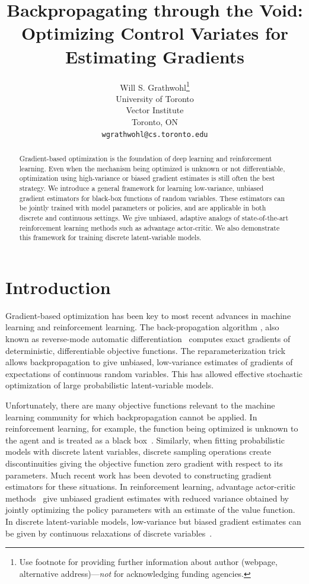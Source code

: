 \documentclass{article}
\title{Backpropagating through the Void:\\ Optimizing Control Variates for\\ Estimating Gradients}
\author{
  Will S. Grathwohl\thanks{Use footnote for providing further
    information about author (webpage, alternative
    address)---\emph{not} for acknowledging funding agencies.} \\
  University of Toronto\\
  Vector Institute\\
  Toronto, ON \\
  \texttt{wgrathwohl@cs.toronto.edu} \\
}
\begin{document}
\maketitle
\begin{abstract}
Gradient-based optimization is the foundation of deep learning and reinforcement learning.
Even when the mechanism being optimized is unknown or not differentiable, optimization using high-variance or biased gradient estimates is still often the best strategy.
We introduce a general framework for learning low-variance, unbiased gradient estimators for black-box functions of random variables.
These estimators can be jointly trained with model parameters or policies, and are applicable in both discrete and continuous settings.
We give unbiased, adaptive analogs of state-of-the-art reinforcement learning methods such as advantage actor-critic.
We also demonstrate this framework for training discrete latent-variable models.
\end{abstract}


\section{Introduction}
Gradient-based optimization has been key to most recent advances in machine learning and reinforcement learning.
The back-propagation algorithm \citep{rumelhart1986learning}, also known as reverse-mode automatic differentiation~\citep{speelpenning1980compiling, rall1981automatic} computes exact gradients of deterministic, differentiable objective functions.
The reparameterization trick \citep{williams1992simple, kingma2013autoencoding, rezende2014stochastic} allows backpropagation to give unbiased, low-variance estimates of gradients of expectations of continuous random variables.
This has allowed effective stochastic optimization of large probabilistic latent-variable models.

Unfortunately, there are many objective functions relevant to the machine learning community for which backpropagation cannot be applied. In reinforcement learning, for example, the function being optimized is unknown to the agent and is treated as a black box~\citep{schulman2015gradient}. Similarly, when fitting probabilistic models with discrete latent variables, discrete sampling operations create discontinuities giving the objective function zero gradient with respect to its parameters.
Much recent work has been devoted to constructing gradient estimators for these situations.
In reinforcement learning, advantage actor-critic methods~\citep{mnih2016asynchronous} give unbiased gradient estimates with reduced variance obtained by jointly optimizing the policy parameters with an estimate of the value function.
In discrete latent-variable models, low-variance but biased gradient estimates can be given by continuous relaxations of discrete variables~\citep{maddison2016concrete, jang2016categorical}.
\end{document}
